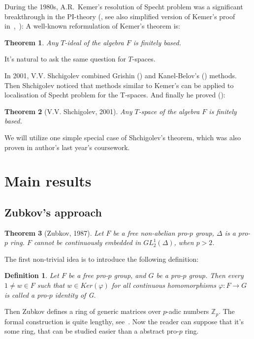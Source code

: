 \documentclass[12pt,a4paper]{article}
\newtheorem*{theorem*}{Theorem}
\newtheorem{definition}{Definition}[subsection]
\begin{document}
    During the 1980s, A.R.\ Kemer's resolution of Specht problem was a significant breakthrough in the PI-theory (\cite{Kemer}, see also simplified version of Kemer's proof in~\cite{Aljadeff-Kanel-Karasik},~\cite{Procesi}):
    A well-known reformulation of Kemer's theorem is:

    \vskip 0.1in\noindent
    \begin{theorem*}
        Any $T$-ideal of the algebra $F$ is finitely based.
    \end{theorem*}
    \vskip 0.1in\noindent

    It's natural to ask the same question for $T$-spaces.

    In 2001, V.V. Shchigolev combined Grishin (\cite{Grishin}) and Kanel-Belov's (\cite{Kanel}) methods.
    Then Shchigolev noticed that methods similar to Kemer's can be applied to localisation of Specht problem for the T-spaces.
    And finally he proved (\cite{Shchigolev}):

    \vskip 0.1in\noindent
    \begin{theorem*} [V.V. Shchigolev, 2001]
        Any $T$-space of the algebra $F$ is finitely based.
    \end{theorem*}
    \vskip 0.1in\noindent

    We will utilize one simple special case of Shchigolev's theorem, which was also proven in author's last year's coursework.


    \section{Main results}

    \subsection{Zubkov's approach}

    \begin{theorem*}[Zubkov, 1987]
        Let $F$ be a free non-abelian pro-$p$ group, $\Delta$ is a pro-$p$ ring.
        $F$ cannot be continuously embedded in $GL^1_2(\Delta)$, when $p>2$.
    \end{theorem*}
    \vskip 0.1in\noindent

    The first non-trivial idea is to introduce the following definition:
    \vskip 0.1in\noindent
    \begin{definition}
        Let $F$ be a free pro-$p$ group, and $G$ be a pro-$p$ group.
        Then every $1\neq w\in F$ such that $w\in Ker(\varphi)$ for all continuous homomorphisms $\varphi: F\to G$ is called a pro-$p$ identity of G.
    \end{definition}
    \vskip 0.1in\noindent
    Then Zubkov defines a ring of generic matrices over $p$-adic numbers $\mathbb{Z}_p$. The formal construction is quite lengthy, see~\cite{Zubkov}.
    Now the reader can suppose that it's some ring, that can be studied easier than a abstract pro-$p$ ring.
\end{document}
